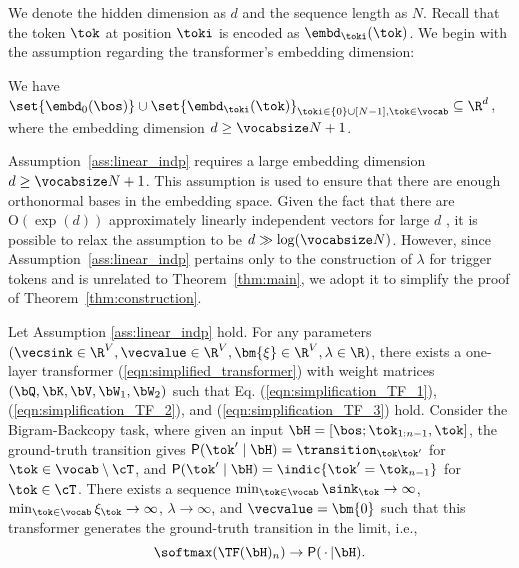 We denote the hidden dimension as $d$ and the sequence length as $N$. Recall that the token $\tok$ at position $\toki$ is encoded as $\embd_\toki(\tok)$. We begin with the assumption regarding the transformer's embedding dimension:
\begin{assumption}\label{ass:linear_indp}
We have $\set{\embd_0(\bos)} \cup \set{\embd_\toki(\tok)}_{\toki\in\{ 0 \} \cup [N-1],\tok\in\vocab} \subseteq \R^d$, where the embedding dimension  $d\geq \vocabsize N + 1$. %
\end{assumption}
Assumption~\ref{ass:linear_indp} requires a large embedding dimension $d\geq \vocabsize N +  1$.  This assumption is used to ensure that there are enough orthonormal bases in the embedding space. Given the fact that there are $\text{O}(\exp(d))$ approximately linearly independent vectors for large $d$ \citep{vershynin2018high}, it is possible to relax the assumption to be $d \gg \log(\vocabsize N)$. However, since Assumption~\ref{ass:linear_indp} pertains only to the construction of $\lambda$ for trigger tokens and is unrelated to Theorem~\ref{thm:main}, we adopt it to simplify the proof of Theorem~\ref{thm:construction}.


\begin{theorem} \label{appthm:formal-contruct} Let Assumption \ref{ass:linear_indp} hold. For any parameters $(\vecsink \in \R^{V}, \vecvalue \in \R^V, \bm{\xi} \in \R^V, \lambda \in \R)$, there exists a one-layer transformer (\ref{eqn:simplified_transformer}) with weight matrices $(\bQ, \bK, \bV, \bW_1, \bW_2)$ such that Eq. (\ref{eqn:simplification_TF_1}), (\ref{eqn:simplification_TF_2}), and (\ref{eqn:simplification_TF_3}) hold. Consider the Bigram-Backcopy task, where given an input $\bH = [\bos; \tok_{1:n-1}, \tok]$, the ground-truth transition gives ${\sf P}(\tok^\prime\mid \bH) = \transition_{\tok \tok^\prime}$ for $\tok\in\vocab\setminus\cT$, and ${\sf P}(\tok^\prime\mid \bH ) = \indic{\tok^\prime=\tok_{n-1}}$ for $\tok \in \cT$. 
There exists a sequence $\min_{\tok\in\vocab} \sink_\tok \to \infty$, $\min_{\tok\in\vocab} \xi_\tok \to \infty$, $\lambda\to\infty$, and $\vecvalue=\bm{0}$ such that this transformer generates the ground-truth transition in the limit, i.e., 
\begin{equation}\label{eqn:TF_ground_truth_match}
\softmax(\TF(\bH)_n) \to {\sf P}(\, \cdot\, | \bH).
\end{equation}
\end{theorem}

